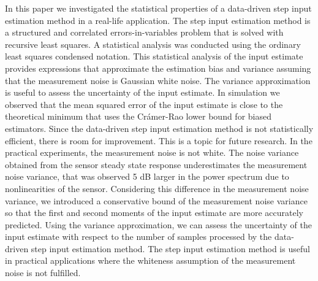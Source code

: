 In this paper we investigated the statistical properties of a data-driven step input estimation method in a real-life application.
The step input estimation method is a structured and correlated errors-in-variables problem that is solved with recursive least squares.
A statistical analysis was conducted using the ordinary least squares condensed notation. 
This statistical analysis of the input estimate provides expressions that approximate the estimation bias and variance assuming that the measurement noise is Gaussian white noise. 
The variance approximation is useful to assess the uncertainty of the input estimate.
In simulation we observed that the mean squared error of the input estimate is close to the theoretical minimum that uses the Cr\'amer-Rao lower bound for biased estimators.
Since the data-driven step input estimation method is not statistically efficient, there is room for improvement. This is a topic for future research.
In the practical experiments, the measurement noise is not white.
The noise variance obtained from the sensor steady state response underestimates the measurement noise variance, that was observed 5 dB larger in the power spectrum due to nonlinearities of the sensor.
Considering this difference in the measurement noise variance, we introduced a conservative bound of the measurement noise variance so that the first and second moments of the input estimate are more accurately predicted.
Using the variance approximation, we can assess the uncertainty of the input estimate with respect to the number of samples processed by the data-driven step input estimation method.
The step input estimation method is useful in practical applications where the whiteness assumption of the measurement noise is not fulfilled. 


\newpage

